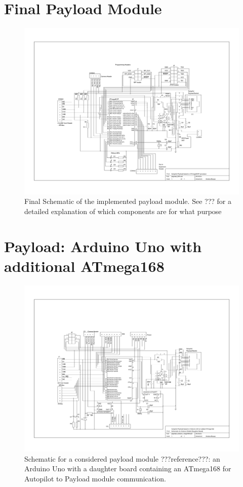 \section{Final Payload Module}
\label{Payload_Schematic}
\begin{figure}[H]
\includegraphics[width=1.4\textwidth, angle=90]{schematics/payload_644.pdf}
\caption{Final Schematic of the implemented payload module. See ??? for a 
detailed explanation of which components are for what purpose}
\end{figure}

\section{Payload: Arduino Uno with additional ATmega168}
\begin{figure}[H]
\includegraphics[width=1.4\textwidth, angle=90]{schematics/payload_arduino_mega168.pdf}
\caption{Schematic for a considered payload module ???reference???: an 
Arduino Uno with a daughter board containing an ATmega168 for Autopilot to 
Payload module communication.}
\end{figure}

